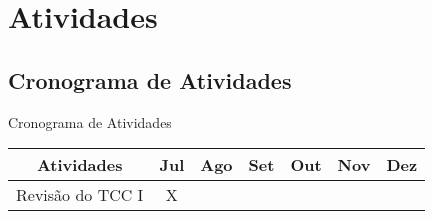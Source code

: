 
\section{Atividades}
    \label{sec:atividades}
    
    \subsection{Cronograma de Atividades}
        \label{subsec:cronograma-atividades}
        
        
        \begin{quadro}[h]
        \caption{Cronograma de Atividades}
        \centering
        \begin{tabular}{c c c c c c c} \hline
            \label{quad:cronograma-atividades}
            \textbf{Atividades} & \textbf{Jul} & \textbf{Ago} & \textbf{Set} & \textbf{Out} & \textbf{Nov} & \textbf{Dez} \\ \hline
            Revisão do TCC I        & X &   &   &   &   &   \\ \hline
        \end{tabular}
    \end{quadro}